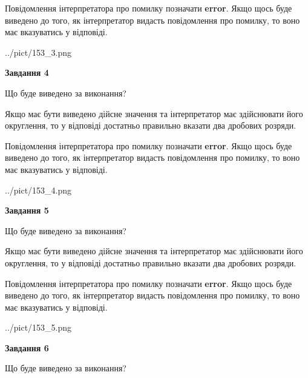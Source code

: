 \documentclass[12pt, ukrainian]{article}
\begin{document}
{\begin {Large}
Повідомлення інтерпретатора про помилку позначати \textbf{error}.
Якщо щось буде виведено до того, як інтерпретатор видасть повідомлення про помилку, 
то воно має вказуватись у відповіді. \par

\begin{center}
	{../pict/153_3.png}
\end{center}
\newpage

{\begin {center}\textbf{Завдання 4}\end {center}}\par
Що буде виведено за виконання? \par

Якщо має бути виведено дійсне значення та інтерпретатор має здійснювати його округлення, 
то у відповіді достатньо правильно вказати два дробових розряди.

Повідомлення інтерпретатора про помилку позначати \textbf{error}.
Якщо щось буде виведено до того, як інтерпретатор видасть повідомлення про помилку, 
то воно має вказуватись у відповіді. \par

\begin{center}
	{../pict/153_4.png}
\end{center}
\newpage

{\begin {center}\textbf{Завдання 5}\end {center}}\par
Що буде виведено за виконання? \par

Якщо має бути виведено дійсне значення та інтерпретатор має здійснювати його округлення, 
то у відповіді достатньо правильно вказати два дробових розряди.

Повідомлення інтерпретатора про помилку позначати \textbf{error}.
Якщо щось буде виведено до того, як інтерпретатор видасть повідомлення про помилку, 
то воно має вказуватись у відповіді. \par

\begin{center}
	{../pict/153_5.png}
\end{center}
\newpage

{\begin {center}\textbf{Завдання 6}\end {center}}\par
Що буде виведено за виконання? \par


\end{Large}}
\end{document}
